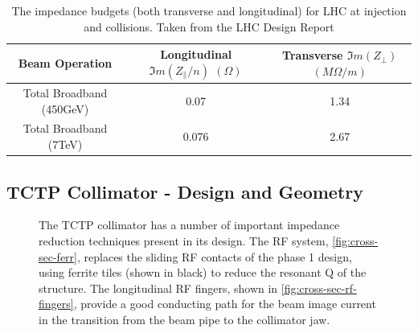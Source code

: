 \begin{table}
\caption{The impedance budgets (both transverse and longitudinal) for LHC at injection and collisions. Taken from the LHC Design Report \cite{Ruggiero:LHCColEff}}
\begin{center}
\begin{tabular}{c | c | c}
Beam Operation & Longitudinal $\Im{}m ( Z_{\parallel}/n )$ $( \Omega )$ & Transverse $\Im{}m ( Z_{\perp} )$ $(M \Omega /m )$\\ \hline
Total Broadband (450GeV) & 0.07 & 1.34 \\ \hline
Total Broadband (7TeV) & 0.076 & 2.67 \\ \hline
\end{tabular}
\end{center}
\label{tab:lhc-impedance-budget}
\end{table}

\subsection{TCTP Collimator - Design and Geometry}

\begin{figure}
\label{fig:tctp-figure}
\caption{The TCTP collimator has a number of important impedance reduction techniques present in its design. The RF system, \ref{fig:cross-sec-ferr}, replaces the sliding RF contacts of the phase 1 design, using ferrite tiles (shown in black) to reduce the resonant Q of the structure. The longitudinal RF fingers, shown in \ref{fig:cross-sec-rf-fingers}, provide a good conducting path for the beam image current in the transition from the beam pipe to the collimator jaw.}
\end{figure}

